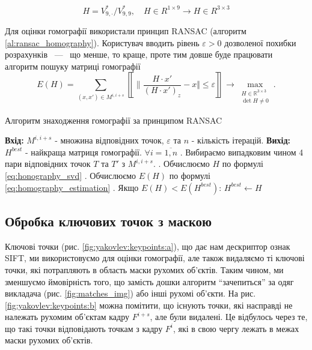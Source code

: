 \begin{equation}
    H = V^{*}_{9,\cdot }/V^{*}_{9,9},\quad H \in R^{1 \times 9} \rightarrow H \in R^{3 \times 3}
    \label{eq:honography_svd}
\end{equation}

Для оцінки гомографії використали принцип RANSAC \cite{ransac} (алгоритм \ref{al:ransac_homography}).
Користувач вводить рівень \(\varepsilon > 0\)
дозволеної похибки розрахунків ~---~ що менше, то краще, проте тим довше
буде працювати алгоритм пошуку матриці гомографії
\begin{equation}
    E(H) = \sum_{(x,x') \in M^{i,i+s}}
    \left\llbracket \|
    \frac{H\cdot x'}{(H\cdot x')_z} - x
    \Vert \leq \varepsilon
    \right\rrbracket
    \to \max\limits_{\substack{H \in \mathbb{R}^{3 \times 3} \\ \det{H} \neq 0}}.
    \label{eq:homography_estimation}
\end{equation}

\begin{algorithm}[H]
    \caption{Алгоритм знаходження гомографії за принципом RANSAC}
    \label{al:ransac_homography}
    \begin{algorithmic}
        \State \textbf{Вхід:} $M^{i,i+s}$ - множина відповідних точок, $\varepsilon$ та $n$ - кількість ітерацій.
        \State \textbf{Вихід:} $H^{best}$ - найкраща матриця гомографії.
        \State $\forall i = \overline{1,n}$
        \State {}. Вибираємо випадковим чином 4 пари відповідних точок $T$ та $T'$ з $M^{i,i+s}$.
        \State {}. Обчислюємо $H$ по формулі \eqref{eq:honography_svd}
        \State {}. Обчислюємо $E(H)$ по формулі \eqref{eq:homography_estimation}
        \State {}. Якщо  $E(H) < E(H^{best})$:
        \State \qquad $H^{best} \gets H$
    \end{algorithmic}
\end{algorithm}

\subsection{Обробка ключових точок з маскою}

Ключові точки (рис. \ref{fig:yakovlev:keypoints:a}), що дає нам дескриптор ознак SIFT, ми
використовуємо для оцінки гомографії, але також видаляємо ті ключові
точки, які потрапляють в область маски рухомих об'єктів.
Таким чином, ми зменшуємо ймовірність того, що замість дошки алгоритм ``зачепиться'' за одяг
викладача (рис. \ref{fig:matches_img}) або інші рухомі об'єкти.
На рис. \ref{fig:yakovlev:keypoints:b} можна помітити, що
існують точки, які насправді не належать рухомим об'єктам кадру
\(F^{i + s}\), але були видалені. Це відбулось через те, що такі точки
відповідають точкам з кадру \(F^{i}\), які в свою чергу лежать в межах маски рухомих об'єктів.

